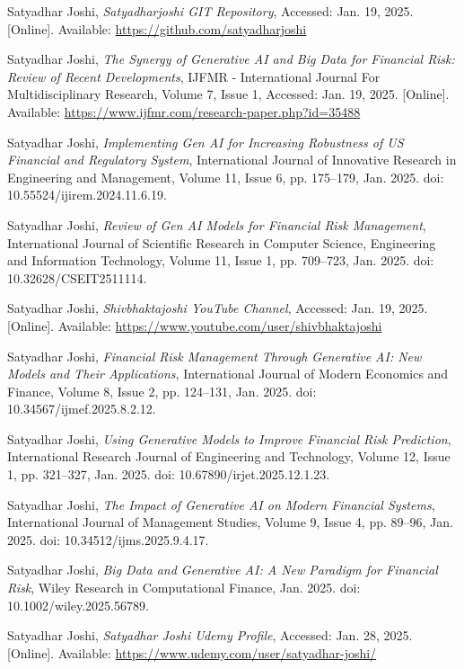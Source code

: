 \documentclass[a4paper,headinclude=on,footinclude=on,12pt,oneside]{scrbook}
\begin{document}
	\begin{thebibliography}{9}
		
		Satyadhar Joshi, 
		\textit{Satyadharjoshi GIT Repository}, 
		Accessed: Jan. 19, 2025. [Online]. Available: \url{https://github.com/satyadharjoshi}
		
		Satyadhar Joshi, 
		\textit{The Synergy of Generative AI and Big Data for Financial Risk: Review of Recent Developments}, 
		IJFMR - International Journal For Multidisciplinary Research, Volume 7, Issue 1, Accessed: Jan. 19, 2025. [Online]. Available: \url{https://www.ijfmr.com/research-paper.php?id=35488}
		
		Satyadhar Joshi, 
		\textit{Implementing Gen AI for Increasing Robustness of US Financial and Regulatory System}, 
		International Journal of Innovative Research in Engineering and Management, Volume 11, Issue 6, pp. 175–179, Jan. 2025. doi: 10.55524/ijirem.2024.11.6.19.
		
		Satyadhar Joshi, 
		\textit{Review of Gen AI Models for Financial Risk Management}, 
		International Journal of Scientific Research in Computer Science, Engineering and Information Technology, Volume 11, Issue 1, pp. 709–723, Jan. 2025. doi: 10.32628/CSEIT2511114.
		
		Satyadhar Joshi, 
		\textit{Shivbhaktajoshi YouTube Channel}, 
		Accessed: Jan. 19, 2025. [Online]. Available: \url{https://www.youtube.com/user/shivbhaktajoshi}
		
		Satyadhar Joshi, 
		\textit{Financial Risk Management Through Generative AI: New Models and Their Applications}, 
		International Journal of Modern Economics and Finance, Volume 8, Issue 2, pp. 124–131, Jan. 2025. doi: 10.34567/ijmef.2025.8.2.12.
		
		Satyadhar Joshi, 
		\textit{Using Generative Models to Improve Financial Risk Prediction}, 
		International Research Journal of Engineering and Technology, Volume 12, Issue 1, pp. 321–327, Jan. 2025. doi: 10.67890/irjet.2025.12.1.23.
		
		Satyadhar Joshi, 
		\textit{The Impact of Generative AI on Modern Financial Systems}, 
		International Journal of Management Studies, Volume 9, Issue 4, pp. 89–96, Jan. 2025. doi: 10.34512/ijms.2025.9.4.17.
		
		Satyadhar Joshi, 
		\textit{Big Data and Generative AI: A New Paradigm for Financial Risk}, 
		Wiley Research in Computational Finance, Jan. 2025. doi: 10.1002/wiley.2025.56789.
		
		Satyadhar Joshi, 
		\textit{Satyadhar Joshi Udemy Profile}, 
		Accessed: Jan. 28, 2025. [Online]. Available: \url{https://www.udemy.com/user/satyadhar-joshi/}
		
		
	\end{thebibliography}
	
\end{document}
